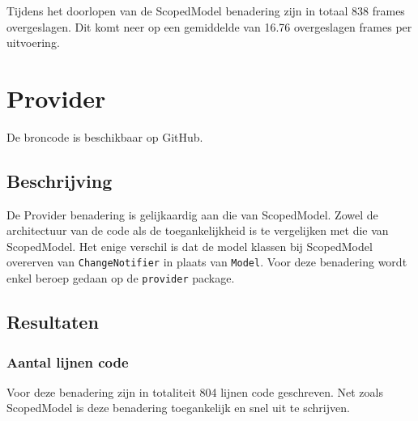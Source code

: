 Tijdens het doorlopen van de ScopedModel benadering zijn in totaal 838 frames overgeslagen. Dit komt neer op een gemiddelde van 16.76 overgeslagen frames per uitvoering.

\section{Provider}
De broncode is beschikbaar op GitHub. \autocite{DeVrient2019b}
\subsection{Beschrijving}
De Provider benadering is gelijkaardig aan die van ScopedModel. Zowel de architectuur van de code als de toegankelijkheid is te vergelijken met die van ScopedModel. Het enige verschil is dat de model klassen bij ScopedModel overerven van \verb|ChangeNotifier| in plaats van \verb|Model|. \newline \newline
Voor deze benadering wordt enkel beroep gedaan op de \verb|provider| package. 

\subsection{Resultaten}
\subsubsection{Aantal lijnen code}
Voor deze benadering zijn in totaliteit 804 lijnen code geschreven. Net zoals ScopedModel is deze benadering toegankelijk en snel uit te schrijven.

